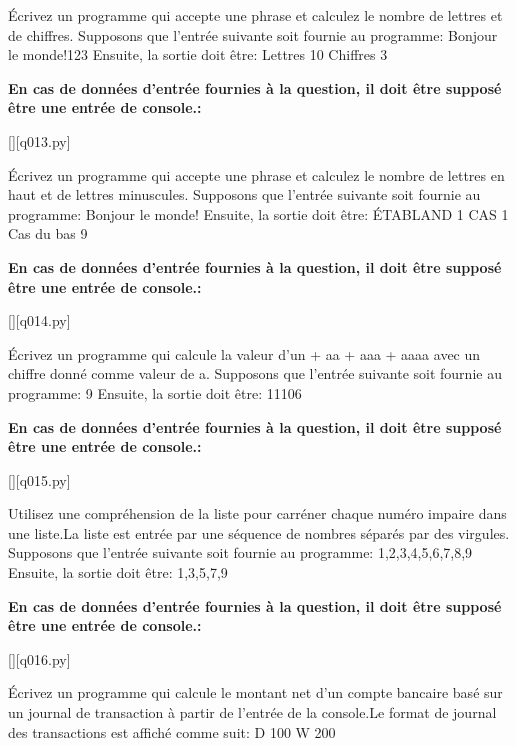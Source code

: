 \question
Écrivez un programme qui accepte une phrase et calculez le nombre de lettres et de chiffres.
Supposons que l'entrée suivante soit fournie au programme:
Bonjour le monde!123
Ensuite, la sortie doit être:
Lettres 10
Chiffres 3
\par
\textbf{En cas de données d'entrée fournies à la question, il doit être supposé être une entrée de console.:}
\renewcommand{\nomfichier}{q013.py}
\begin{solution}
    \pythonfile{\chemincode \nomfichier}[][q013.py]
\end{solution}


\question
Écrivez un programme qui accepte une phrase et calculez le nombre de lettres en haut et de lettres minuscules.
Supposons que l'entrée suivante soit fournie au programme:
Bonjour le monde!
Ensuite, la sortie doit être:
ÉTABLAND 1 CAS 1
Cas du bas 9
\par
\textbf{En cas de données d'entrée fournies à la question, il doit être supposé être une entrée de console.:}
\renewcommand{\nomfichier}{q014.py}
\begin{solution}
    \pythonfile{\chemincode \nomfichier}[][q014.py]
\end{solution}


\question
Écrivez un programme qui calcule la valeur d'un + aa + aaa + aaaa avec un chiffre donné comme valeur de a.
Supposons que l'entrée suivante soit fournie au programme:
9
Ensuite, la sortie doit être:
11106
\par
\textbf{En cas de données d'entrée fournies à la question, il doit être supposé être une entrée de console.:}
\renewcommand{\nomfichier}{q015.py}
\begin{solution}
    \pythonfile{\chemincode \nomfichier}[][q015.py]
\end{solution}


\question
Utilisez une compréhension de la liste pour carréner chaque numéro impaire dans une liste.La liste est entrée par une séquence de nombres séparés par des virgules.
Supposons que l'entrée suivante soit fournie au programme:
1,2,3,4,5,6,7,8,9
Ensuite, la sortie doit être:
1,3,5,7,9
\par
\textbf{En cas de données d'entrée fournies à la question, il doit être supposé être une entrée de console.:}
\renewcommand{\nomfichier}{q016.py}
\begin{solution}
    \pythonfile{\chemincode \nomfichier}[][q016.py]
\end{solution}


\question
Écrivez un programme qui calcule le montant net d'un compte bancaire basé sur un journal de transaction à partir de l'entrée de la console.Le format de journal des transactions est affiché comme suit:
D 100
W 200

